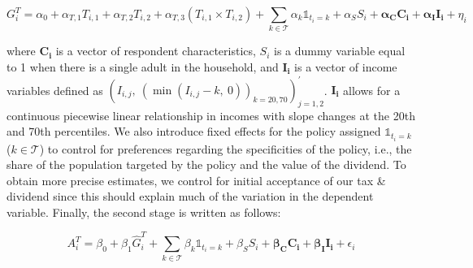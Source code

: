 \documentclass[12pt]{article} %
\newcommand{\un}{\mathds{1}} %
\begin{document}

\vspace{-0.5cm}

\begin{equation}
    G_i^T = \alpha_0 + \alpha_{T,1} T_{i,1} + \alpha_{T,2} T_{i,2} + \alpha_{T,3} \left( T_{i,1} \times T_{i,2} \right) + \sum_{k\in\mathcal{T}} \alpha_k \un_{t_i=k}  + \alpha_S S_i + \mathbf{\alpha_C C_i} + \mathbf{\alpha_I I_i} + \eta_i
    \label{eq:first_stage_parametric_rdd_approve_winner}
\end{equation}

\vspace{0.2cm}

\noindent %
where $\mathbf{C_i}$ is a vector of respondent characteristics, $S_i$ is a dummy variable equal to 1 when there is a single adult in the household, and $\mathbf{I_i}$ is a vector of income variables defined as $\left(I_{i,j},\:\left(\min(I_{i,j}-k,\:0)\right)_{k=20,70}\right)^{\prime}_{j=1,2}$. $\mathbf{I_i}$ allows for a continuous piecewise linear relationship in incomes with slope changes at the 20th and 70th percentiles. We also introduce fixed effects for the policy assigned $\un_{t_i=k}$ ($k\in \mathcal{T}$) to control for preferences regarding the specificities of the policy, i.e., the share of the population targeted by the policy and the value of the dividend. To obtain more precise estimates, we control for initial acceptance of our tax \& dividend since this should explain much of the variation in the dependent variable. Finally, the second stage is written as follows:


\noindent

\begin{equation}
    A_i^T = \beta_0 + \beta_1 \widehat{G}_i^T + \sum_{k\in\mathcal{T}} \beta_k \un_{t_i=k} + \beta_S S_i + \mathbf{\beta_C C_i} + \mathbf{\beta_I I_i} + \epsilon_i
    \label{eq:second_stage_with_rdd_approve_winner}
\end{equation}
\end{document}
